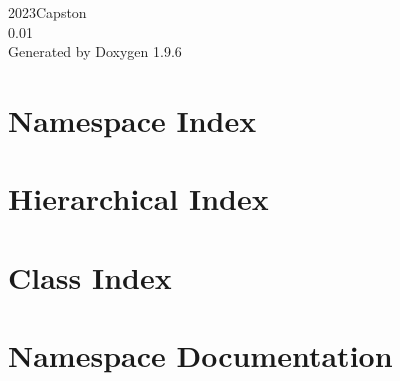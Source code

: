 \documentclass[twoside]{book}
\newcommand{\+}{\discretionary{\mbox{\scriptsize$\hookleftarrow$}}{}{}}
\newcommand{\clearemptydoublepage}{%
    \newpage{\pagestyle{empty}\cleardoublepage}%
  }
\begin{document}
  \raggedbottom
    \hypersetup{pageanchor=false,
                bookmarksnumbered=true,
                pdfencoding=unicode
               }
  \begin{titlepage}
  \vspace*{7cm}
  \begin{center}%
  {\Large 2023\+Capston}\\
  [1ex]\large 0.\+01 \\
  \vspace*{1cm}
  {\large Generated by Doxygen 1.9.6}\\
  \end{center}
  \end{titlepage}
  \clearemptydoublepage
  \tableofcontents
  \clearemptydoublepage
  \hypersetup{pageanchor=true}
\chapter{Namespace Index}

\chapter{Hierarchical Index}

\chapter{Class Index}

\chapter{Namespace Documentation}






\end{document}
